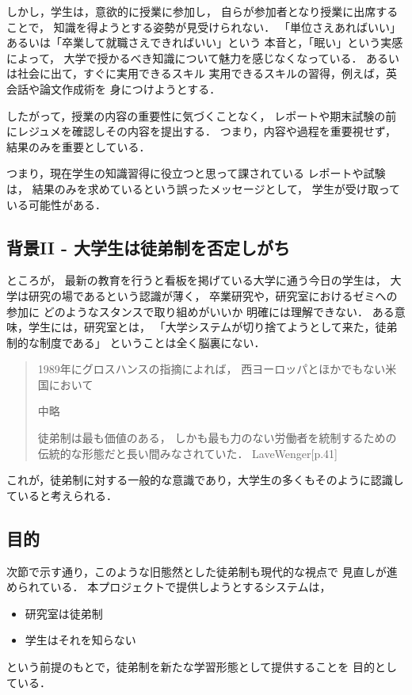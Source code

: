 \documentclass{hissymp}
\begin{document}
しかし，学生は，意欲的に授業に参加し，
自らが参加者となり授業に出席することで，
知識を得ようとする姿勢が見受けられない．
「単位さえあればいい」あるいは「卒業して就職さえできればいい」という
本音と，「眠い」という実感によって，
大学で授かるべき知識について魅力を感じなくなっている．
あるいは社会に出て，すぐに実用できるスキル
実用できるスキルの習得，例えば，英会話や論文作成術を
身につけようとする．

したがって，授業の内容の重要性に気づくことなく，
レポートや期末試験の前にレジュメを確認しその内容を提出する．
つまり，内容や過程を重要視せず，結果のみを重要としている．

つまり，現在学生の知識習得に役立つと思って課されている
レポートや試験は，
結果のみを求めているという誤ったメッセージとして，
学生が受け取っている可能性がある．

\subsection{背景II - 大学生は徒弟制を否定しがち}
\label{sec:orgd7a3f58}
ところが，
最新の教育を行うと看板を掲げている大学に通う今日の学生は，
大学は研究の場であるという認識が薄く，
卒業研究や，研究室におけるゼミへの参加に
どのようなスタンスで取り組めがいいか
明確には理解できない．
ある意味，学生には，研究室とは，
「大学システムが切り捨てようとして来た，徒弟制的な制度である」
ということは全く脳裏にない．
\begin{quote}
1989年にグロスハンスの指摘によれば，
西ヨーロッパとほかでもない米国において

中略

徒弟制は最も価値のある，
しかも最も力のない労働者を統制するための伝統的な形態だと長い間みなされていた．
LaveWenger[p.41]
\end{quote}
これが，徒弟制に対する一般的な意識であり，大学生の多くもそのように認識していると考えられる．

\subsection{目的}
\label{sec:org60dc5bc}
次節で示す通り，このような旧態然とした徒弟制も現代的な視点で
見直しが進められている．
本プロジェクトで提供しようとするシステムは，
\begin{itemize}
\item 研究室は徒弟制
\item 学生はそれを知らない
\end{itemize}
という前提のもとで，徒弟制を新たな学習形態として提供することを
目的としている．
\end{document}
